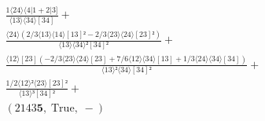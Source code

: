 \documentclass[varwidth, border=5pt]{standalone}
\begin{document}
\begin{my}
$\begin{gathered}
\scriptscriptstyle\frac{1⟨24⟩⟨4|1+2|3]}{⟨13⟩⟨34⟩[34]} +\\
\scriptscriptstyle\frac{⟨24⟩(2/3⟨13⟩⟨14⟩[13]²-2/3⟨23⟩⟨24⟩[23]²)}{⟨13⟩⟨34⟩²[34]²} +\\
\scriptscriptstyle\frac{⟨12⟩[23](-2/3⟨23⟩⟨24⟩[23]+7/6⟨12⟩⟨34⟩[13]+1/3⟨24⟩⟨34⟩[34])}{⟨13⟩²⟨34⟩[34]²} +\\
\scriptscriptstyle\frac{1/2⟨12⟩²⟨23⟩[23]²}{⟨13⟩³[34]²} +\\
\scriptscriptstyle(2143𝟓,\;\text{True},\;-) \phantom{+}
\end{gathered}$
\end{my}
\end{document}
